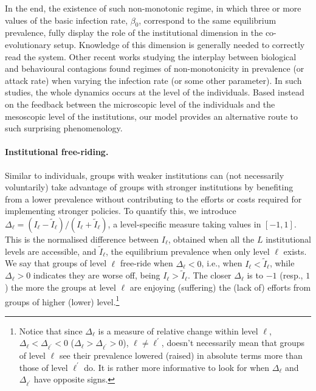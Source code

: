 In the end, the existence of such non-monotonic regime, in which three or more values of the basic infection rate, $\beta_0$, correspond to the same equilibrium prevalence, fully display the role of the institutional dimension in the co-evolutionary setup. Knowledge of this dimension is generally needed to correctly read the system. Other recent works studying the interplay between biological and behavioural contagions \cite{qiu_understanding_2022,morsky_impact_2023,saad-roy_dynamics_2023} found regimes of non-monotonicity in prevalence (or attack rate) when varying the infection rate (or some other parameter). In such studies, the whole dynamics occurs at the level of the individuals. Based instead on the feedback between the microscopic level of the individuals and the mesoscopic level of the institutions, our model provides an alternative route to such surprising phenomenology.


\paragraph*{Institutional free-riding.}

Similar to individuals, groups with weaker institutions can (not necessarily voluntarily) take advantage of groups with stronger institutions by benefiting from a lower prevalence without contributing to the efforts or costs required for implementing stronger policies. To quantify this, we introduce $\Delta_\ell = (I_\ell - \tilde{I}_\ell) / (I_\ell + \tilde{I}_\ell)$, a level-specific measure taking values in $[-1,1]$. This is the normalised difference between $I_\ell$, obtained when all the $L$ institutional levels are accessible, and $\tilde{I}_\ell$, the equilibrium prevalence when only level $\ell$ exists.
We say that groups of level $\ell$ free-ride when $\Delta_\ell<0$, i.e., when $I_\ell < \tilde{I}_\ell$, while $\Delta_\ell>0$ indicates they are worse off, being $I_\ell > \tilde{I}_\ell$. The closer $\Delta_\ell$ is to $-1$ (resp., $1$) the more the groups at level $\ell$ are enjoying (suffering) the (lack of) efforts from groups of higher (lower) level.\footnote{Notice that since $\Delta_\ell$ is a measure of relative change within level $\ell$, $\Delta_\ell < \Delta_{\ell^\prime} < 0$ ($\Delta_\ell > \Delta_{\ell^\prime} > 0$), $\ell \neq \ell^\prime$, doesn't necessarily mean that groups of level $\ell$ see their prevalence lowered (raised) in absolute terms more than those of level $\ell^\prime$ do. It is rather more informative to look for when $\Delta_\ell$ and $\Delta_{\ell^\prime}$ have opposite signs.}

